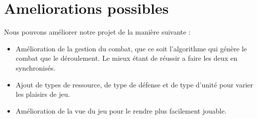 \chapter{Ameliorations possibles}
    Nous pouvons améliorer notre projet de la manière suivante :
    \begin{itemize}
    \item Amélioration de la gestion du combat, que ce soit l'algorithme qui génère le combat que le déroulement. Le mieux étant de réussir a faire les deux en synchronisés. 
    \item Ajout de types de ressource, de type de défense et de type d'unité pour varier les plaisirs de jeu.
    \item Amélioration de la vue du jeu pour le rendre plus facilement jouable. 
    \end{itemize}